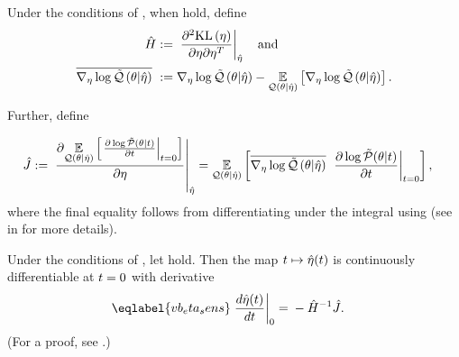 \begin{defn}
%
Under the conditions of , when  hold, define
%
\begin{align*}
%
\hessopt :={}& \fracat{\partial^2 \KL{\eta}}
                      {\partial \eta \partial \eta^T}
                      {\etaopt} \mathand \\
%
\lqgradbar{\theta \vert \etaopt} :={}&
    \lqgrad{\theta \vert \etaopt} -
    \expect{\q(\theta \vert \etaopt)}{\lqgrad{\theta \vert \etaopt}}.
%
\end{align*}


Further, define

\begin{align*}
%
\crosshessian :={}&
    \fracat{\partial
            \expect{\q(\theta \vert \etaopt)}
                   {\fracat{\partial \log \ptil(\theta \vert \t)}
                           {\partial \t}{\t=0} }
            }
        {\partial \eta}{\etaopt}
={}
    \expect{\q(\theta \vert \etaopt)}{
          \lqgradbar{\theta \vert \etaopt}
          \fracat{\partial \log \ptil(\theta \vert \t)}
                 {\partial \t}{\t=0}},
%
\end{align*}
%
where the final equality follows from differentiating under the integral using
 (see  in  for
more details).
%
\end{defn}


\begin{thm}
%
Under the conditions of , let
 hold.   Then the map $t \mapsto
\hat\eta(t)$ is continuously differentiable at $t=0$ with derivative
%
\begin{align}\eqlabel{vb_eta_sens}
%
\fracat{d \etaopt(\t)}{d \t}{0} ={}&
    - \hessopt^{-1} \crosshessian.
%
\end{align}
%
(For a proof, see  .)
%
\end{thm}
